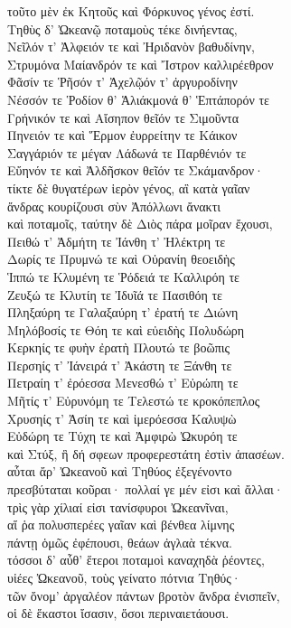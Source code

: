 \begin{pages}
\begin{Leftside}
τοῦτο μὲν ἐκ Κητοῦς καὶ Φόρκυνος γένος ἐστί. \\
Τηθὺς δ' Ὠκεανῷ ποταμοὺς τέκε δινήεντας,\\
Νεῖλόν τ' Ἀλφειόν τε καὶ Ἠριδανὸν βαθυδίνην,\\
Στρυμόνα Μαίανδρόν τε καὶ Ἴστρον καλλιρέεθρον\\
Φᾶσίν τε Ῥῆσόν τ' Ἀχελῷόν τ' ἀργυροδίνην \\
Νέσσόν τε Ῥοδίον θ' Ἁλιάκμονά θ' Ἑπτάπορόν τε\\
Γρήνικόν τε καὶ Αἴσηπον θεῖόν τε Σιμοῦντα\\
Πηνειόν τε καὶ Ἕρμον ἐυρρείτην τε Κάικον\\
Σαγγάριόν τε μέγαν Λάδωνά τε Παρθένιόν τε\\
Εὔηνόν τε καὶ Ἀλδῆσκον θεῖόν τε Σκάμανδρον· \\
τίκτε δὲ θυγατέρων ἱερὸν γένος, αἳ κατὰ γαῖαν\\
ἄνδρας κουρίζουσι σὺν Ἀπόλλωνι ἄνακτι\\
καὶ ποταμοῖς, ταύτην δὲ Διὸς πάρα μοῖραν ἔχουσι,\\
Πειθώ τ' Ἀδμήτη τε Ἰάνθη τ' Ἠλέκτρη τε\\
Δωρίς τε Πρυμνώ τε καὶ Οὐρανίη θεοειδὴς \\
Ἱππώ τε Κλυμένη τε Ῥόδειά τε Καλλιρόη τε\\
Ζευξώ τε Κλυτίη τε Ἰδυῖά τε Πασιθόη τε\\
Πληξαύρη τε Γαλαξαύρη τ' ἐρατή τε Διώνη\\
Μηλόβοσίς τε Θόη τε καὶ εὐειδὴς Πολυδώρη \\
Κερκηίς τε φυὴν ἐρατὴ Πλουτώ τε βοῶπις \\
Περσηίς τ' Ἰάνειρά τ' Ἀκάστη τε Ξάνθη τε\\
Πετραίη τ' ἐρόεσσα Μενεσθώ τ' Εὐρώπη τε\\
Μῆτίς τ' Εὐρυνόμη τε Τελεστώ τε κροκόπεπλος\\
Χρυσηίς τ' Ἀσίη τε καὶ ἱμερόεσσα Καλυψὼ\\
Εὐδώρη τε Τύχη τε καὶ Ἀμφιρὼ Ὠκυρόη τε \\
καὶ Στύξ, ἣ δή σφεων προφερεστάτη ἐστὶν ἁπασέων.\\
αὗται ἄρ' Ὠκεανοῦ καὶ Τηθύος ἐξεγένοντο\\
πρεσβύταται κοῦραι· πολλαί γε μέν εἰσι καὶ ἄλλαι·\\
τρὶς γὰρ χίλιαί εἰσι τανίσφυροι Ὠκεανῖναι,\\
αἵ ῥα πολυσπερέες γαῖαν καὶ βένθεα λίμνης \\
πάντῃ ὁμῶς ἐφέπουσι, θεάων ἀγλαὰ τέκνα. \\
τόσσοι δ' αὖθ' ἕτεροι ποταμοὶ καναχηδὰ ῥέοντες,\\
υἱέες Ὠκεανοῦ, τοὺς γείνατο πότνια Τηθύς· \\
τῶν ὄνομ' ἀργαλέον πάντων βροτὸν ἄνδρα ἐνισπεῖν, \\
οἱ δὲ ἕκαστοι ἴσασιν, ὅσοι περιναιετάουσι.  \\


\end{Leftside}
\end{pages}
